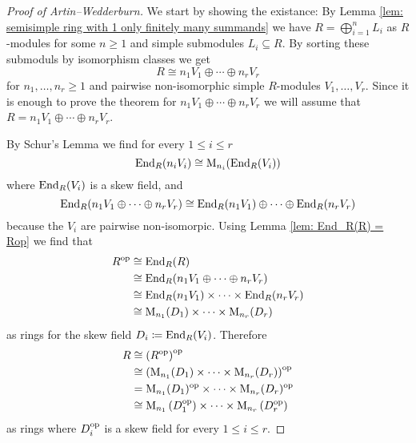 \begin{proof}[Proof of Artin--Wedderburn]
  We start by showing the existance:
  By Lemma \ref{lem: semisimple ring with 1 only finitely many summands} we have $R = \bigoplus_{i = 1}^n L_i$ as $R$-modules for some $n \geq 1$ and simple submodules $L_i \subseteq R$.
  By sorting these submoduls by isomorphism classes we get
  \[
    R \cong n_1 V_1 \oplus \dotsb \oplus n_r V_r
  \]
  for $n_1, \dotsc, n_r \geq 1$ and pairwise non-isomorphic simple $R$-modules $V_1, \dotsc, V_r$.
  Since it is enough to prove the theorem for $n_1 V_1 \oplus \dotsb \oplus n_r V_r$ we will assume that $R = n_1 V_1 \oplus \dotsb \oplus n_r V_r$.
  
  By Schur’s Lemma we find for every $1 \leq i \leq r$
  \[
          \operatorname{End}_R(n_i V_i)
    \cong \operatorname{M}_{n_i}(\operatorname{End}_R(V_i))
  \]
  where $\operatorname{End}_R(V_i)$ is a skew field, and
  \[
          \operatorname{End}_R(n_1 V_1 \oplus \dotsb \oplus n_r V_r)
    \cong \operatorname{End}_R(n_1 V_1) \oplus \dotsb \oplus \operatorname{End}_R(n_r V_r)
  \]
  because the $V_i$ are pairwise non-isomorpic.
  Using Lemma \ref{lem: End_R(R) = Rop} we find that
  \begin{align*}
            R^{\mathrm{op}}
    &\cong  \operatorname{End}_R(R) \\
    &\cong  \operatorname{End}_R(n_1 V_1 \oplus \dotsb \oplus n_r V_r) \\
    &\cong  \operatorname{End}_R(n_1 V_1) \times \dotsb \times \operatorname{End}_R(n_r V_r) \\
    &\cong  \operatorname{M}_{n_1}(D_1) \times \dotsb \times \operatorname{M}_{n_r}(D_r)
  \end{align*}
  as rings for the skew field $D_i \coloneqq \operatorname{End}_R(V_i)$.
  Therefore
  \begin{align*}
            R
    &\cong  \left( R^{\mathrm{op}} \right)^{\mathrm{op}} \\
    &\cong  \left( \operatorname{M}_{n_1}(D_1) \times \dotsb \times \operatorname{M}_{n_r}(D_r) \right)^{\mathrm{op}} \\
    &=      \operatorname{M}_{n_1}(D_1)^{\mathrm{op}} \times \dotsb \times \operatorname{M}_{n_r}(D_r)^{\mathrm{op}} \\
    &\cong  \operatorname{M}_{n_1}\left( D_1^{\mathrm{op}} \right) \times \dotsb \times \operatorname{M}_{n_r}\left( D_r^{\mathrm{op}} \right)
  \end{align*}
  as rings where $D_i^{\mathrm{op}}$ is a skew field for every $1 \leq i \leq r$.
  

\end{proof}
